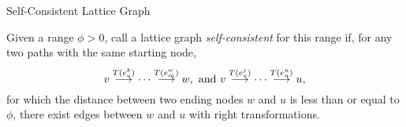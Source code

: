 \begin{frame}{Self-Consistent Lattice Graph}
  \begin{definition}
    \small{Given a range $\phi > 0$, call a lattice graph
      \textit{self-consistent} for this range if, for any two paths with the
      same starting node,
      $${v}\overset{T(e_v^{k})}{\longrightarrow}{\cdots}\overset{T(e_m^{w})}{\longrightarrow}{w}, \text{ and }{v}\overset{T(e_v^{j})}{\longrightarrow}{\cdots}\overset{T(e_n^{u})}{\longrightarrow}{u},$$
      for which the distance between two ending nodes $w$ and $u$ is
      less than or equal to $\phi$, there exist edges between $w$ and
      $u$ with right transformations.}
  \end{definition}
  \begin{columns}[T] %
    \begin{column}{.45\textwidth}
        
    \end{column}%
    \begin{column}{.45\textwidth}
        
    \end{column}%
  \end{columns}
\end{frame}
